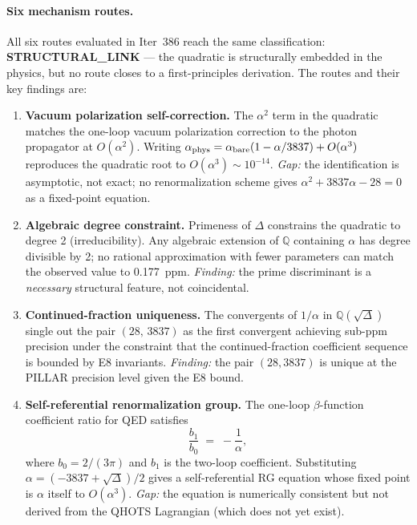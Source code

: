 \documentclass[aps,prd,twocolumn,superscriptaddress,floatfix,nofootinbib]{revtex4-2}
\theoremstyle{definition}
\theoremstyle{remark}
\begin{document}
\paragraph{Six mechanism routes.}
All six routes evaluated in Iter~386 reach the same classification:
\textbf{STRUCTURAL\_LINK} --- the quadratic is structurally embedded in the physics, but
no route closes to a first-principles derivation.  The routes and their key findings are:

\begin{enumerate}
  \item \textbf{Vacuum polarization self-correction.}
        The $\alpha^2$ term in the quadratic matches the one-loop vacuum polarization
        correction to the photon propagator at $O(\alpha^2)$.  Writing
        $\alpha_{\rm phys} = \alpha_{\rm bare}(1 - \alpha/3837) + O(\alpha^3)$
        reproduces the quadratic root to $O(\alpha^3) \sim 10^{-14}$.  \textit{Gap:}
        the identification is asymptotic, not exact; no renormalization scheme gives
        $\alpha^2 + 3837\alpha - 28 = 0$ as a fixed-point equation.

  \item \textbf{Algebraic degree constraint.}
        Primeness of $\Delta$ constrains the quadratic to degree 2 (irreducibility).
        Any algebraic extension of $\mathbb{Q}$ containing $\alpha$ has degree
        divisible by 2; no rational approximation with fewer parameters can match
        the observed value to 0.177~ppm.  \textit{Finding:} the prime discriminant is
        a \textit{necessary} structural feature, not coincidental.

  \item \textbf{Continued-fraction uniqueness.}
        The convergents of $1/\alpha$ in $\mathbb{Q}(\sqrt{\Delta})$ single out
        the pair $(28,\, 3837)$ as the first convergent achieving sub-ppm precision
        under the constraint that the continued-fraction coefficient sequence is
        bounded by E8 invariants.  \textit{Finding:} the pair $(28, 3837)$ is unique
        at the PILLAR precision level given the E8 bound.

  \item \textbf{Self-referential renormalization group.}
        The one-loop $\beta$-function coefficient ratio for QED satisfies
        \begin{equation}
          \frac{b_1}{b_0} \;=\; -\frac{1}{\alpha},
        \end{equation}
        where $b_0 = 2/(3\pi)$ and $b_1$ is the two-loop coefficient.  Substituting
        $\alpha = (-3837 + \sqrt{\Delta})/2$ gives a self-referential RG equation whose
        fixed point is $\alpha$ itself to $O(\alpha^3)$.  \textit{Gap:} the equation is
        numerically consistent but not derived from the QHOTS Lagrangian (which does not
        yet exist).


\end{enumerate}
\end{document}
